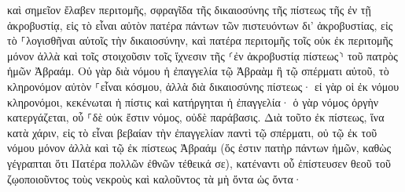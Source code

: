 \documentclass{openreader}
\begin{document}
καὶ σημεῖον ἔλαβεν περιτομῆς, σφραγῖδα τῆς δικαιοσύνης τῆς πίστεως τῆς ἐν τῇ ἀκροβυστίᾳ, εἰς τὸ εἶναι αὐτὸν πατέρα πάντων τῶν πιστευόντων δι’ ἀκροβυστίας, εἰς τὸ ⸀λογισθῆναι αὐτοῖς τὴν δικαιοσύνην, 
καὶ πατέρα περιτομῆς τοῖς οὐκ ἐκ περιτομῆς μόνον ἀλλὰ καὶ τοῖς στοιχοῦσιν τοῖς ἴχνεσιν τῆς ⸂ἐν ἀκροβυστίᾳ πίστεως⸃ τοῦ πατρὸς ἡμῶν Ἀβραάμ. 
Οὐ γὰρ διὰ νόμου ἡ ἐπαγγελία τῷ Ἀβραὰμ ἢ τῷ σπέρματι αὐτοῦ, τὸ κληρονόμον αὐτὸν ⸀εἶναι κόσμου, ἀλλὰ διὰ δικαιοσύνης πίστεως· 
εἰ γὰρ οἱ ἐκ νόμου κληρονόμοι, κεκένωται ἡ πίστις καὶ κατήργηται ἡ ἐπαγγελία· 
ὁ γὰρ νόμος ὀργὴν κατεργάζεται, οὗ ⸀δὲ οὐκ ἔστιν νόμος, οὐδὲ παράβασις. 
Διὰ τοῦτο ἐκ πίστεως, ἵνα κατὰ χάριν, εἰς τὸ εἶναι βεβαίαν τὴν ἐπαγγελίαν παντὶ τῷ σπέρματι, οὐ τῷ ἐκ τοῦ νόμου μόνον ἀλλὰ καὶ τῷ ἐκ πίστεως Ἀβραάμ (ὅς ἐστιν πατὴρ πάντων ἡμῶν, 
καθὼς γέγραπται ὅτι Πατέρα πολλῶν ἐθνῶν τέθεικά σε), κατέναντι οὗ ἐπίστευσεν θεοῦ τοῦ ζῳοποιοῦντος τοὺς νεκροὺς καὶ καλοῦντος τὰ μὴ ὄντα ὡς ὄντα· 
\end{document}
